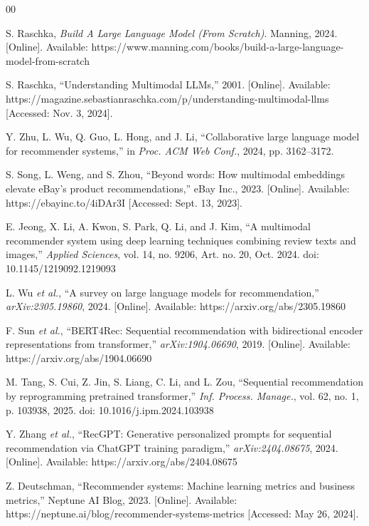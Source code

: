 \documentclass[conference]{IEEEtran}
\begin{document}
\begin{thebibliography}{00}

 S. Raschka, \textit{Build A Large Language Model (From Scratch)}. Manning, 2024. [Online]. Available: https://www.manning.com/books/build-a-large-language-model-from-scratch

 S. Raschka, ``Understanding Multimodal LLMs,'' 2001. [Online]. Available: https://magazine.sebastianraschka.com/p/understanding-multimodal-llms [Accessed: Nov. 3, 2024].

 Y. Zhu, L. Wu, Q. Guo, L. Hong, and J. Li, ``Collaborative large language model for recommender systems,'' in \textit{Proc. ACM Web Conf.}, 2024, pp. 3162--3172.

 S. Song, L. Weng, and S. Zhou, ``Beyond words: How multimodal embeddings elevate eBay's product recommendations,'' eBay Inc., 2023. [Online]. Available: https://ebayinc.to/4iDAr3I [Accessed: Sept. 13, 2023].

 E. Jeong, X. Li, A. Kwon, S. Park, Q. Li, and J. Kim, ``A multimodal recommender system using deep learning techniques combining review texts and images,'' \textit{Applied Sciences}, vol. 14, no. 9206, Art. no. 20, Oct. 2024. doi: 10.1145/1219092.1219093

 L. Wu \textit{et al.}, ``A survey on large language models for recommendation,'' \textit{arXiv:2305.19860}, 2024. [Online]. Available: https://arxiv.org/abs/2305.19860

 F. Sun \textit{et al.}, ``BERT4Rec: Sequential recommendation with bidirectional encoder representations from transformer,'' \textit{arXiv:1904.06690}, 2019. [Online]. Available: https://arxiv.org/abs/1904.06690

 M. Tang, S. Cui, Z. Jin, S. Liang, C. Li, and L. Zou, ``Sequential recommendation by reprogramming pretrained transformer,'' \textit{Inf. Process. Manage.}, vol. 62, no. 1, p. 103938, 2025. doi: 10.1016/j.ipm.2024.103938

 Y. Zhang \textit{et al.}, ``RecGPT: Generative personalized prompts for sequential recommendation via ChatGPT training paradigm,'' \textit{arXiv:2404.08675}, 2024. [Online]. Available: https://arxiv.org/abs/2404.08675

 Z. Deutschman, ``Recommender systems: Machine learning metrics and business metrics,'' Neptune AI Blog, 2023. [Online]. Available: https://neptune.ai/blog/recommender-systems-metrics [Accessed: May 26, 2024].


\end{thebibliography}
\end{document}
